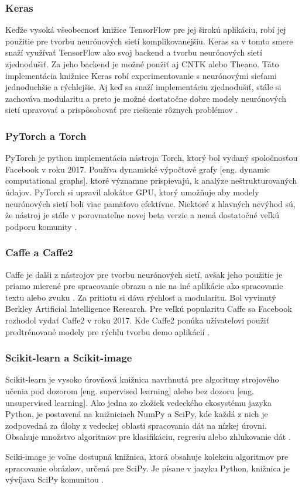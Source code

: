 \subsubsection{Keras}
Keďže vysoká všeobecnosť knižice TensorFlow pre jej širokú aplikáciu, robí jej použitie pre tvorbu neurónových sietí komplikovanejšiu.
Keras sa v tomto smere snaží využívať TensorFlow ako svoj backend a tvorbu neurónových sietí zjednodušiť.
Za jeho backend je možné použiť aj CNTK alebo Theano.
Táto implementácia knižnice Keras robí experimentovanie s neurónovými sieťami jednoduchšie a rýchlejšie.
Aj keď sa snaží implementáciu zjednodušiť, stále si zachováva modularitu a preto je možné dostatočne dobre modely neurónových sietí upravovať a prispôsobovať pre riešienie rôznych problémov \cite{odkaz:Keras}.

\subsubsection{PyTorch a Torch}
PyTorch je python implementácia nástroja Torch, ktorý bol vydaný spoločnosťou Facebook v roku 2017.
Používa dynamické výpočtové grafy [eng. dynamic computational graphs], ktoré významne prispievajú, k analýze neštrukturovaných údajov.
PyTorch si upravil alokátor GPU, ktorý umožňuje aby modely neurónových sietí boli viac pamäťovo efektívne.
Niektoré z hlavných nevýhod sú, že nástroj je stále v porovnateľne novej beta verzie a nemá dostatočné veľkú podporu komunity \cite{odkaz:FrameworkComparison}.

\subsubsection{Caffe a Caffe2}
Caffe je dalši z nástrojov pre tvorbu neurónových sietí, avšak jeho použitie je priamo mierené pre spracovanie obrazu a nie na iné aplikácie
    ako spracovanie textu alebo zvuku \cite{odkaz:FrameworkComparison2}.
Za pritiotu si dáva rýchlosť a modularitu. Bol vyvinutý Berkley Artificial Intelligence Research.
Pre veľkú popularitu Caffe sa Facebook rozhodol vydať Caffe2 v roku 2017.
Kde Caffe2 ponúka užívateľovi použiť predtrénované modely pre rýchlu tvorbu demo aplikácií \cite{odkaz:FrameworkComparison}.

\subsubsection{Scikit-learn a Scikit-image}
Scikit-learn je vysoko úrovňová knižnica navrhnutá pre algoritmy strojového učenia pod dozorom [eng. supervised learning] alebo bez dozoru [eng. unsupervised learning].
Ako jedna zo zložiek vedeckého ekosystému jazyka Python, je postavená na knižniciach NumPy a SciPy, kde každá z nich je zodpovedná za úlohy z vedeckej oblasti spracovania dát na nízkej úrovni.
Obsahuje množstvo algoritmov pre klasifikáciu, regresiu alebo zhlukovanie dát \cite{odkaz:FrameworkComparison3}.

Sciki-image je voľne dostupná knižnica, ktorá obsahuje kolekciu algoritmov pre spracovanie obrázkov, určená pre SciPy.
Je písane v jazyku Python, knižnica je vývíjava SciPy komunitou \cite{prop:scikit-image}.
